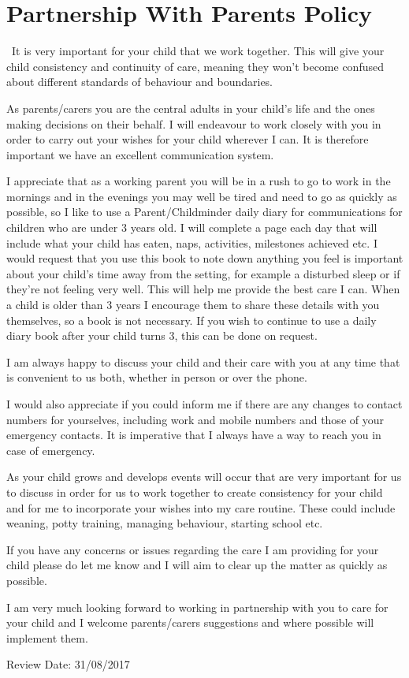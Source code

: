 

\section{Partnership With Parents Policy}

~It is very important for your child that we work together. This will
give your child consistency and continuity of care, meaning they won't
become confused about different standards of behaviour and boundaries.

As parents/carers you are the central adults in your child's life and
the ones making decisions on their behalf. I will endeavour to work
closely with you in order to carry out your wishes for your child
wherever I can. It is therefore important we have an excellent
communication system.

I appreciate that as a working parent you will be in a rush to go to
work in the mornings and in the evenings you may well be tired and need
to go as quickly as possible, so I like to use a Parent/Childminder
daily diary for communications for children who are under 3 years old. I
will complete a page each day that will include what your child has
eaten, naps, activities, milestones achieved etc. I would request that
you use this book to note down anything you feel is important about your
child's time away from the setting, for example a disturbed sleep or if
they're not feeling very well. This will help me provide the best care I
can. When a child is older than 3 years I encourage them to share these
details with you themselves, so a book is not necessary. If you wish to
continue to use a daily diary book after your child turns 3, this can be
done on request.

I am always happy to discuss your child and their care with you at any
time that is convenient to us both, whether in person or over the phone.

I would also appreciate if you could inform me if there are any changes
to contact numbers for yourselves, including work and mobile numbers and
those of your emergency contacts. It is imperative that I always have a
way to reach you in case of emergency.

As your child grows and develops events will occur that are very
important for us to discuss in order for us to work together to create
consistency for your child and for me to incorporate your wishes into my
care routine. These could include weaning, potty training, managing
behaviour, starting school etc.

If you have any concerns or issues regarding the care I am providing for
your child please do let me know and I will aim to clear up the matter
as quickly as possible.

I am very much looking forward to working in partnership with you to
care for your child and I welcome parents/carers suggestions and where
possible will implement them.

Review Date: 31/08/2017


